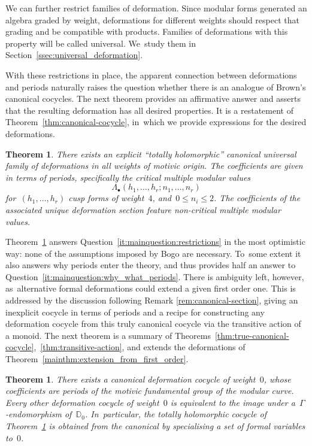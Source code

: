 \documentclass[JEP,XML,SOM,Unicode,published]{cedram}
\let\oldbullet\bullet
\renewcommand{\bullet}{{\scriptscriptstyle\oldbullet}}
\theoremstyle{plain}
\newtheorem{maintheorem}[maintheoremcounter]{Theorem}
\theoremstyle{definition}
\newcommand{\nbd}{\nobreakdash-\hspace{0pt}}
\newcommand{\bbD}{\ensuremath{\mathbb{D}}}
\let\Ga\Gamma
\begin{document}
We can further restrict families of deformation. Since modular forms generated an algebra graded by weight, deformations for different weights should respect that grading and be compatible with products. Families of deformations with this property will be called universal. We~study them in Section~\ref{ssec:universal_deformation}.

With these restrictions in place, the apparent connection between deformations and periods naturally raises the question whether there is an analogue of Brown's canonical cocycles. The next theorem provides an affirmative answer and asserts that the resulting deformation has all desired properties. It is a restatement of Theorem~\ref{thm:canonical-cocycle}, in~which we provide expressions for the desired deformations.

\begin{maintheorem}
\label{mainthm:canonical-in-all-weight}
There exists an explicit ``totally holomorphic'' canonical universal family of deformations in all weights of motivic origin. The coefficients are given in terms of periods, specifically the critical multiple modular values
\begin{equation*}
\Lambda_\bullet(h_1,\ldots,h_r;n_1,\ldots,n_r)
\end{equation*}
for~$(h_1,\ldots,h_r)$ cusp forms of weight~$4$, and~$0\leq n_i\leq 2$. The coefficients of the associated unique deformation section feature non-critical multiple modular values.
\end{maintheorem}

Theorem~\ref{mainthm:canonical-in-all-weight} answers Question~\ref{it:mainquestion:restrictions} in the most optimistic way: none of the assumptions imposed by Bogo are necessary. To~some extent it also answers why periods enter the theory, and thus provides half an answer to Question~\ref{it:mainquestion:why_what_periods}. There is ambiguity left, however, as~alternative formal deformations could extend a given first order one. This is addressed by the discussion following Remark \ref{rem:canonical-section}, giving an inexplicit cocycle in terms of periods and a recipe for constructing any deformation cocycle from this truly canonical cocycle via the transitive action of a monoid.
The next theorem is a summary of Theorems~\ref{thm:true-canonical-cocycle},~\ref{thm:transitive-action}, and extends the deformations of Theorem~\ref{mainthm:extension_from_first_order}.

\begin{maintheorem}
\label{mainthm:uniqueness}
There exists a canonical deformation cocycle of weight~$0$, whose coefficients are periods of the motivic fundamental group of the modular curve. Every other deformation cocycle of weight~$0$ is equivalent to the image under a~$\Ga$\nbd{}endomorphism of\/~$\bbD_0$. In~particular, the totally holomorphic cocycle of Theorem~\ref{mainthm:canonical-in-all-weight} is obtained from the canonical by specialising a set of formal variables to~$0$.
\end{maintheorem}
\end{document}
